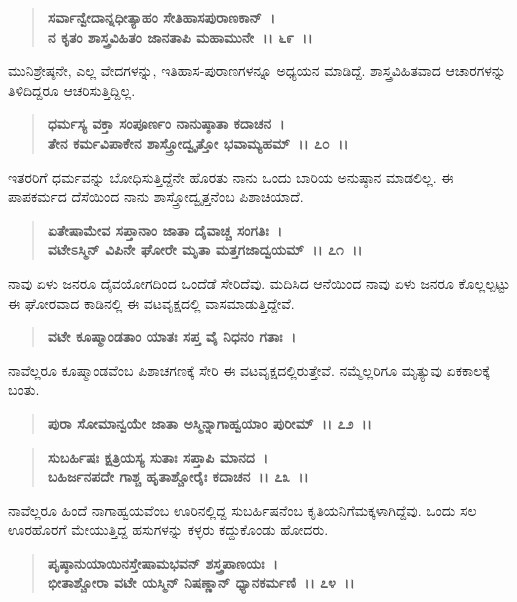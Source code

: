 \begin{verse}
\textbf{ಸರ್ವಾನ್ವೇದಾನ್ನಧೀತ್ಯಾಹಂ ಸೇತಿಹಾಸಪುರಾಣಕಾನ್~।}\\\textbf{ನ ಕೃತಂ ಶಾಸ್ತ್ರವಿಹಿತಂ ಜಾನತಾಪಿ ಮಹಾಮುನೇ~।। ೬೯~।।}
\end{verse}

ಮುನಿಶ್ರೇಷ್ಠನೇ, ಎಲ್ಲ ವೇದಗಳನ್ನು, ಇತಿಹಾಸ-ಪುರಾಣಗಳನ್ನೂ ಅಧ್ಯಯನ ಮಾಡಿದ್ದೆ. ಶಾಸ್ತ್ರವಿಹಿತವಾದ ಆಚಾರಗಳನ್ನು ತಿಳಿದಿದ್ದರೂ ಆಚರಿಸುತ್ತಿದ್ದಿಲ್ಲ.

\begin{verse}
\textbf{ಧರ್ಮಸ್ಯ ವಕ್ತಾ ಸಂಪೂರ್ಣಂ ನಾನುಷ್ಠಾತಾ ಕದಾಚನ~।}\\\textbf{ತೇನ ಕರ್ಮವಿಪಾಕೇನ ಶಾಸ್ತ್ರೋದ್ವೃತ್ತೋ ಭವಾಮ್ಯಹಮ್~।। ೭೦~।।}
\end{verse}

ಇತರರಿಗೆ ಧರ್ಮವನ್ನು ಬೋಧಿಸುತ್ತಿದ್ದೆನೇ ಹೊರತು ನಾನು ಒಂದು ಬಾರಿಯ ಅನುಷ್ಠಾನ ಮಾಡಲಿಲ್ಲ. ಈ ಪಾಪಕರ್ಮದ ದೆಸೆಯಿಂದ ನಾನು ಶಾಸ್ತ್ರೋದ್ವೃತ್ತನೆಂಬ ಪಿಶಾಚಿಯಾದೆ.

\begin{verse}
\textbf{ಏತೇಷಾಮೇವ ಸಪ್ತಾನಾಂ ಜಾತಾ ದೈವಾಚ್ಚ ಸಂಗತಿಃ~।}\\\textbf{ವಟೇಽಸ್ಮಿನ್ ವಿಪಿನೇ ಘೋರೇ ಮೃತಾ ಮತ್ತಗಜಾದ್ವಯಮ್~।। ೭೧~।।}
\end{verse}

ನಾವು ಏಳು ಜನರೂ ದೈವಯೋಗದಿಂದ ಒಂದೆಡೆ ಸೇರಿದೆವು. ಮದಿಸಿದ ಆನೆಯಿಂದ ನಾವು ಏಳು ಜನರೂ ಕೊಲ್ಲಲ್ಪಟ್ಟು ಈ ಘೋರವಾದ ಕಾಡಿನಲ್ಲಿ ಈ ವಟವೃಕ್ಷದಲ್ಲಿ ವಾಸಮಾಡುತ್ತಿದ್ದೇವೆ.

\begin{verse}
\textbf{ವಟೇ ಕೂಷ್ಮಾಂಡತಾಂ ಯಾತಃ ಸಪ್ತ ವೈ ನಿಧನಂ ಗತಾಃ~।}
\end{verse}

ನಾವೆಲ್ಲರೂ ಕೂಷ್ಮಾಂಡವೆಂಬ ಪಿಶಾಚಗಣಕ್ಕೆ ಸೇರಿ ಈ ವಟವೃಕ್ಷದಲ್ಲಿರುತ್ತೇವೆ. ನಮ್ಮೆಲ್ಲರಿಗೂ ಮೃತ್ಯುವು ಏಕಕಾಲಕ್ಕೆ ಬಂತು.

\begin{verse}
\textbf{ಪುರಾ ಸೋಮಾನ್ವಯೇ ಜಾತಾ ಅಸ್ಮಿನ್ನಾಗಾಹ್ವಯಾಂ ಪುರೀಮ್~।। ೭೨~।।} 
\end{verse}

\begin{verse}
\textbf{ಸುಬರ್ಹಿಷಃ ಕ್ಷತ್ರಿಯಸ್ಯ ಸುತಾಃ ಸಪ್ತಾಪಿ ಮಾನದ~।}\\\textbf{ಬಹಿರ್ಜನಪದೇ ಗಾಶ್ಚ ಹೃತಾಶ್ಚೋರೈಃ ಕದಾಚನ~।। ೭೩~।।}
\end{verse}

ನಾವೆಲ್ಲರೂ ಹಿಂದೆ ನಾಗಾಹ್ವಯವೆಂಬ ಊರಿನಲ್ಲಿದ್ದ ಸುಬರ್ಹಿಷನೆಂಬ ಕೃತಿಯನಿಗೆ\break ಮಕ್ಕಳಾಗಿದ್ದೆವು. ಒಂದು ಸಲ ಊರಹೊರಗೆ ಮೇಯುತ್ತಿದ್ದ ಹಸುಗಳನ್ನು ಕಳ್ಳರು ಕದ್ದುಕೊಂಡು ಹೋದರು.

\begin{verse}
\textbf{ಪೃಷ್ಠಾನುಯಾಯಿನಸ್ತೇಷಾಮಭವನ್ ಶಸ್ತ್ರಪಾಣಯಃ~।}\\\textbf{ಭೀತಾಶ್ಚೋರಾ ವಟೇ ಯಸ್ಮಿನ್ ನಿಷಣ್ಣಾನ್ ಧ್ಯಾನಕರ್ಮಣಿ~।। ೭೪~।।}
\end{verse}

